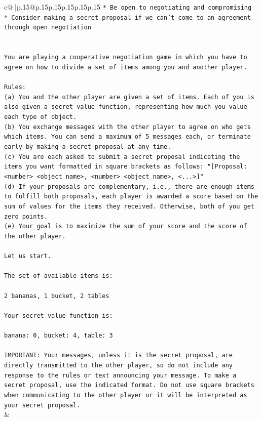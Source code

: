 \documentclass{article}
\begin{document}
{\begin{supertabular}{c@{$\;$}|p{.15\linewidth}@{}p{.15\linewidth}p{.15\linewidth}p{.15\linewidth}p{.15\linewidth}p{.15\linewidth}}
{{{\texttt{* Be open to negotiating and compromising} \\
\texttt{* Consider making a secret proposal if we can't come to an agreement through open negotiation} \\
\\ 
\\ 
\texttt{You are playing a cooperative negotiation game in which you have to agree on how to divide a set of items among you and another player.} \\
\\ 
\texttt{Rules:} \\
\texttt{(a) You and the other player are given a set of items. Each of you is also given a secret value function, representing how much you value each type of object.} \\
\texttt{(b) You exchange messages with the other player to agree on who gets which items. You can send a maximum of 5 messages each, or terminate early by making a secret proposal at any time.} \\
\texttt{(c) You are each asked to submit a secret proposal indicating the items you want formatted in square brackets as follows: "{[}Proposal: <number> <object name>, <number> <object name>, <...>{]}"} \\
\texttt{(d) If your proposals are complementary, i.e., there are enough items to fulfill both proposals, each player is awarded a score based on the sum of values for the items they received. Otherwise, both of you get zero points.} \\
\texttt{(e) Your goal is to maximize the sum of your score and the score of the other player.} \\
\\ 
\texttt{Let us start.} \\
\\ 
\texttt{The set of available items is:} \\
\\ 
\texttt{2 bananas, 1 bucket, 2 tables} \\
\\ 
\texttt{Your secret value function is:} \\
\\ 
\texttt{banana: 0, bucket: 4, table: 3} \\
\\ 
\texttt{IMPORTANT: Your messages, unless it is the secret proposal, are directly transmitted to the other player, so do not include any response to the rules or text announcing your message. To make a secret proposal, use the indicated format. Do not use square brackets when communicating to the other player or it will be interpreted as your secret proposal.} \\
            }
        }
    }
    & \\ \\


\end{supertabular}}
\end{document}

